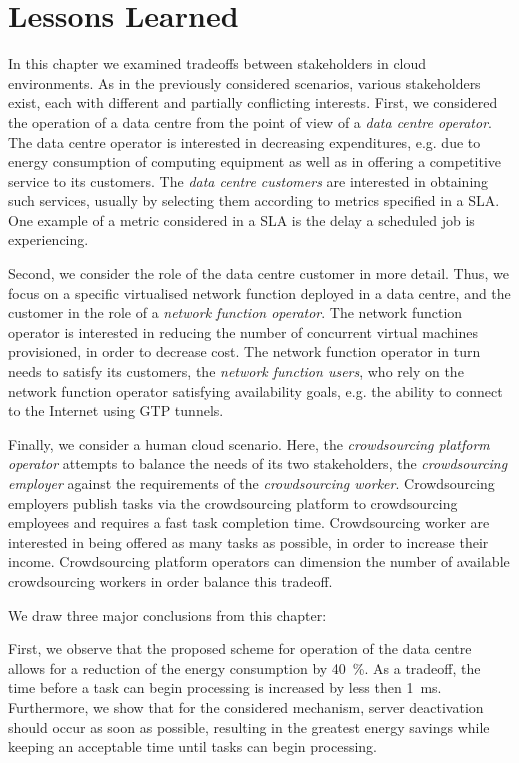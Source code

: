 \section{Lessons Learned}\label{sec:cloud:lessons_learned}
In this chapter we examined tradeoffs between stakeholders in cloud environments.
As in the previously considered scenarios, various stakeholders exist, each with different and partially conflicting interests.
First, we considered the operation of a data centre from the point of view of a \emph{data centre operator}.
The data centre operator is interested in decreasing expenditures, e.g. due to energy consumption of computing equipment as well as in offering a competitive service to its customers.
The \emph{data centre customers} are interested in obtaining such services, usually by selecting them according to metrics specified in a \gls{SLA}.
One example of a metric considered in a \gls{SLA} is the delay a scheduled job is experiencing.

Second, we consider the role of the data centre customer in more detail.
Thus, we focus on a specific virtualised network function deployed in a data centre, and the customer in the role of a \emph{network function operator}.
The network function operator is interested in reducing the number of concurrent virtual machines provisioned, in order to decrease cost.
The network function operator in turn needs to satisfy its customers, the \emph{network function users}, who rely on the network function operator satisfying availability goals, e.g. the ability to connect to the Internet using \gls{GTP} tunnels.

Finally, we consider a human cloud scenario.
Here, the \emph{crowdsourcing platform operator} attempts to balance the needs of its two stakeholders, the \emph{crowdsourcing employer} against the requirements of the \emph{crowdsourcing worker}.
Crowdsourcing employers publish tasks via the crowdsourcing platform to crowdsourcing employees and requires a fast task completion time.
Crowdsourcing worker are interested in being offered as many tasks as possible, in order to increase their income.
Crowdsourcing platform operators can dimension the number of available crowdsourcing workers in order balance this tradeoff. 

We draw three major conclusions from this chapter:

First, we observe that the proposed scheme for operation of the data centre allows for a reduction of the energy consumption by \SI{40}{\percent}.
As a tradeoff, the time before a task can begin processing is increased by less then \SI{1}{\milli\second}.
Furthermore, we show that for the considered mechanism, server deactivation should occur as soon as possible, resulting in the greatest energy savings while keeping an acceptable time until tasks can begin processing. 


